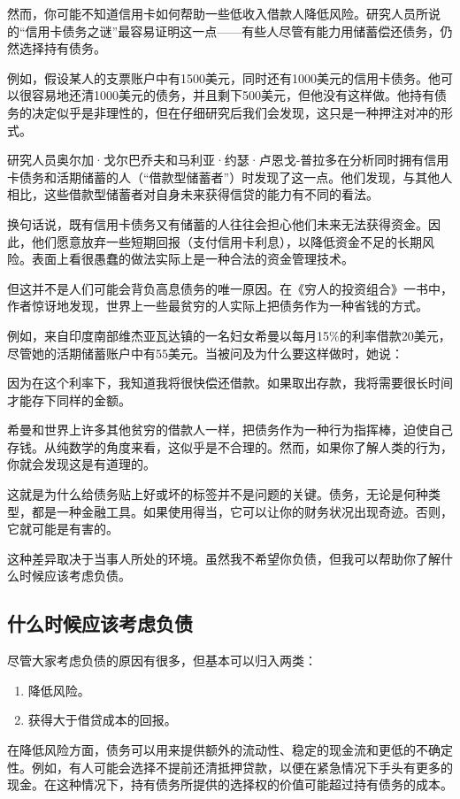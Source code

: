 然而，你可能不知道信用卡如何帮助一些低收入借款人降低风险。研究人员所说的“信用卡债务之谜”最容易证明这一点——有些人尽管有能力用储蓄偿还债务，仍然选择持有债务。

例如，假设某人的支票账户中有1500美元，同时还有1000美元的信用卡债务。他可以很容易地还清1000美元的债务，并且剩下500美元，但他没有这样做。他持有债务的决定似乎是非理性的，但在仔细研究后我们会发现，这只是一种押注对冲的形式。

研究人员奥尔加·戈尔巴乔夫和马利亚·约瑟·卢恩戈-普拉多在分析同时拥有信用卡债务和活期储蓄的人（“借款型储蓄者”）时发现了这一点。他们发现，与其他人相比，这些借款型储蓄者对自身未来获得信贷的能力有不同的看法。

换句话说，既有信用卡债务又有储蓄的人往往会担心他们未来无法获得资金。因此，他们愿意放弃一些短期回报（支付信用卡利息），以降低资金不足的长期风险。表面上看很愚蠢的做法实际上是一种合法的资金管理技术。

但这并不是人们可能会背负高息债务的唯一原因。在《穷人的投资组合》一书中，作者惊讶地发现，世界上一些最贫穷的人实际上把债务作为一种省钱的方式。

例如，来自印度南部维杰亚瓦达镇的一名妇女希曼以每月15\%的利率借款20美元，尽管她的活期储蓄账户中有55美元。当被问及为什么要这样做时，她说：

因为在这个利率下，我知道我将很快偿还借款。如果取出存款，我将需要很长时间才能存下同样的金额。

希曼和世界上许多其他贫穷的借款人一样，把债务作为一种行为指挥棒，迫使自己存钱。从纯数学的角度来看，这似乎是不合理的。然而，如果你了解人类的行为，你就会发现这是有道理的。

这就是为什么给债务贴上好或坏的标签并不是问题的关键。债务，无论是何种类型，都是一种金融工具。如果使用得当，它可以让你的财务状况出现奇迹。否则，它就可能是有害的。

这种差异取决于当事人所处的环境。虽然我不希望你负债，但我可以帮助你了解什么时候应该考虑负债。

\subsection{什么时候应该考虑负债}
尽管大家考虑负债的原因有很多，但基本可以归入两类：

\begin{enumerate}
\item 降低风险。
\item 获得大于借贷成本的回报。
\end{enumerate}

在降低风险方面，债务可以用来提供额外的流动性、稳定的现金流和更低的不确定性。例如，有人可能会选择不提前还清抵押贷款，以便在紧急情况下手头有更多的现金。在这种情况下，持有债务所提供的选择权的价值可能超过持有债务的成本。

